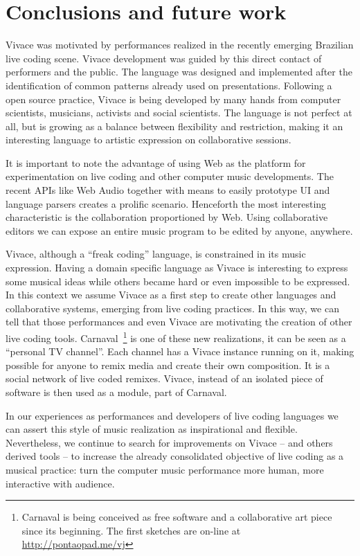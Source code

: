 \documentclass[letterpaper, 12pt]{article}
\begin{document}
\section{Conclusions and future work}

Vivace was motivated by performances realized in the recently emerging
Brazilian live coding scene. Vivace development was guided by this
direct contact of performers and the public. The language was designed
and implemented after the identification of common patterns already
used on presentations. Following a open source practice, Vivace is
being developed by many hands from computer scientists, musicians,
activists and social scientists. The language is not perfect at all,
but is growing as a balance between flexibility and restriction,
making it an interesting language to artistic expression on
collaborative sessions.

It is important to note the advantage of using Web as the platform for
experimentation on live coding and other computer music
developments. The recent APIs like Web Audio together with means to
easily prototype UI and language parsers creates a prolific
scenario. Henceforth the most interesting characteristic is the
collaboration proportioned by Web. Using collaborative editors we can
expose an entire music program to be edited by anyone, anywhere.

Vivace, although a ``freak coding'' language, is constrained in its
music expression. Having a domain specific language as Vivace is
interesting to express some musical ideas while others became hard or
even impossible to be expressed. In this context we assume Vivace as a
first step to create other languages and collaborative systems,
emerging from live coding practices. In this way, we can tell that
those performances and even Vivace are motivating the creation of
other live coding tools. Carnaval~\footnote{Carnaval is being
  conceived as free software and a collaborative art piece since its
  beginning. The first sketches are on-line at
  \url{http://pontaopad.me/vj}} is one of these new realizations, it
can be seen as a ``personal TV channel''. Each channel has a Vivace
instance running on it, making possible for anyone to remix media and
create their own composition. It is a social network of live coded
remixes. Vivace, instead of an isolated piece of software is then used
as a module, part of Carnaval.

In our experiences as performances and developers of live coding
languages we can assert this style of music realization as
inspirational and flexible. Nevertheless, we continue to search for
improvements on Vivace -- and others derived tools -- to increase the
already consolidated objective of live coding as a musical practice:
turn the computer music performance more human, more interactive with
audience.
\end{document}
